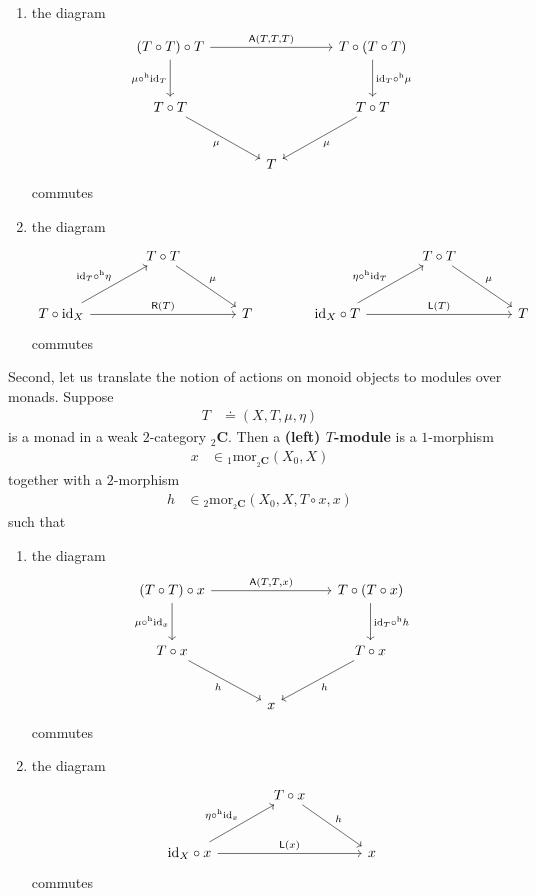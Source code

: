 \begin{enumerate}
\item[(Mon1)]
the diagram
\[
\begin{tikzcd}[sep=large]
  \left(
    T
    \circ
    T
  \right)
  \circ
  T
  \arrow{rr}{\mathsf{A}(T,T,T)}
  \arrow[swap]{d}{\mu \circ^{\textrm{h}} \mathrm{id}_{T}}
  &
  &
  T
  \circ
  \left(
    T
    \circ
    T
  \right)
  \arrow{d}{\mathrm{id}_{T} \circ^{\textrm{h}} \mu}
  \\
  T
  \circ
  T
  \arrow[swap]{dr}{\mu}
  &
  &
  T
  \circ
  T
  \arrow{dl}{\mu}
  \\
  &
  T
  &
\end{tikzcd}
\]
commutes
\item[(Mon2)]
the diagram
\[
\begin{tikzcd}[sep=large]
  &
  T
  \circ
  T
  \arrow{dr}{\mu}
  &
  &
  &
  T
  \circ
  T
  \arrow{dr}{\mu}
  &
  \\
  T
  \circ
  \mathrm{id}_{X}
  \arrow{ur}{\mathrm{id}_{T} \circ^{\textrm{h}} \eta}
  \arrow{rr}{\mathsf{R}(T)}
  &
  &
  T
  &
  \mathrm{id}_{X}
  \circ
  T
  \arrow{ur}{\eta \circ^{\textrm{h}} \mathrm{id}_{T}}
  \arrow{rr}{\mathsf{L}(T)}
  &
  &
  T
\end{tikzcd}
\]
commutes
\end{enumerate}
Second, let us translate the notion of actions on monoid objects to modules over monads.
Suppose
\begin{align*}
  T
  &\doteq
  (X,T,\mu,\eta)
\end{align*}
is a monad in a weak $2$-category ${}_{2}\mathbf{C}$.
Then a \textbf{(left) $T$-module} is a $1$-morphism
\begin{align*}
  x
  &\in
  {}_{1}\mathrm{mor}_{{}_{2}\mathbf{C}}(X_{0},X)
\end{align*}
together with a $2$-morphism
\begin{align*}
  h
  &\in
  {}_{2}\mathrm{mor}_{{}_{2}\mathbf{C}}
  \left(
    X_{0},
    X,
    T
    \circ
    x,
    x
  \right)
\end{align*}
such that
\begin{enumerate}
\item[(LM1)]
the diagram
\[
\begin{tikzcd}[sep=large]
  \left(
    T
    \circ
    T
  \right)
  \circ
  x
  \arrow{rr}{\mathsf{A}(T,T,x)}
  \arrow[swap]{d}{\mu \circ^{\textrm{h}} \mathrm{id}_{x}}
  &
  &
  T
  \circ
  \left(
    T
    \circ
    x
  \right)
  \arrow{d}{\mathrm{id}_{T} \circ^{\textrm{h}} h}
  \\
  T
  \circ
  x
  \arrow[swap]{dr}{h}
  &
  &
  T
  \circ
  x
  \arrow{dl}{h}
  \\
  &
  x
  &
\end{tikzcd}
\]
commutes
\item[(LM2)]
the diagram
\[
\begin{tikzcd}[sep=large]
  &
  T
  \circ
  x
  \arrow{dr}{h}
  &
  \\
  \mathrm{id}_{X}
  \circ
  x
  \arrow{ur}{\eta \circ^{\textrm{h}} \mathrm{id}_{x}}
  \arrow{rr}{\mathsf{L}(x)}
  &
  &
  x
\end{tikzcd}
\]
commutes
\end{enumerate}
